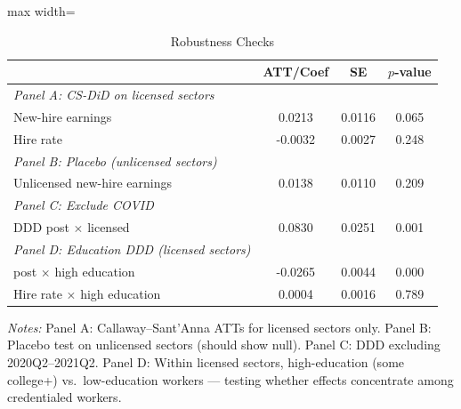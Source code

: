 \begin{table}[H]
\centering
\caption{Robustness Checks}
\label{tab:robust}
\begin{adjustbox}{max width=\textwidth}
\begin{tabular}{lccc}
\toprule
 & ATT/Coef & SE & $p$-value \\
\midrule
\emph{Panel A: CS-DiD on licensed sectors} & & & \\
New-hire earnings & 0.0213 & 0.0116 & 0.065 \\
Hire rate & -0.0032 & 0.0027 & 0.248 \\
\addlinespace
\emph{Panel B: Placebo (unlicensed sectors)} & & & \\
Unlicensed new-hire earnings & 0.0138 & 0.0110 & 0.209 \\
\addlinespace
\emph{Panel C: Exclude COVID} & & & \\
DDD post $\times$ licensed & 0.0830 & 0.0251 & 0.001 \\
\addlinespace
\emph{Panel D: Education DDD (licensed sectors)} & & & \\
post $\times$ high education & -0.0265 & 0.0044 & 0.000 \\
Hire rate $\times$ high education & 0.0004 & 0.0016 & 0.789 \\
\bottomrule
\end{tabular}
\end{adjustbox}

\vspace{0.5em}
{\small \emph{Notes:} Panel A: Callaway--Sant'Anna ATTs for licensed sectors only. Panel B: Placebo test on unlicensed sectors (should show null). Panel C: DDD excluding 2020Q2--2021Q2. Panel D: Within licensed sectors, high-education (some college+) vs.~low-education workers --- testing whether effects concentrate among credentialed workers.}
\end{table}

